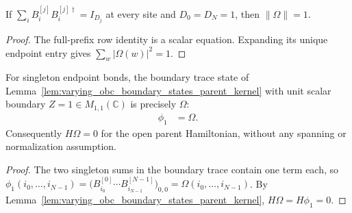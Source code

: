 \begin{lemma}
    \label{lem:varying_obc_scalar_state_normalized}
    \leanok
    If $\sum_iB^{[j]}_i B^{[j]\dagger}_i=I_{D_j}$ at every site and
    $D_0=D_N=1$, then $\|\Omega\|=1$.
\end{lemma}
\begin{proof}\leanok
    The full-prefix row identity is a scalar equation. Expanding its unique
    endpoint entry gives $\sum_w|\Omega(w)|^2=1$.
\end{proof}

\begin{lemma}
    \label{lem:varying_obc_scalar_state_parent_kernel}
    \leanok
    For singleton endpoint bonds, the boundary trace state of
    Lemma~\ref{lem:varying_obc_boundary_states_parent_kernel} with unit
    scalar boundary $Z=1\in M_{1,1}(\mathbb C)$ is precisely $\Omega$:
    \begin{align}
        \phi_1 & =\Omega.
        \label{eq:varying_obc_unit_boundary_state}
    \end{align}
    Consequently $H\Omega=0$ for the open parent Hamiltonian, without any
    spanning or normalization assumption.
\end{lemma}
\begin{proof}\leanok
    The two singleton sums in the boundary trace contain one term each, so
    $\phi_1(i_0,\ldots,i_{N-1})
        =\bigl(B^{[0]}_{i_0}\cdots B^{[N-1]}_{i_{N-1}}\bigr)_{0,0}
        =\Omega(i_0,\ldots,i_{N-1})$.
    By Lemma~\ref{lem:varying_obc_boundary_states_parent_kernel},
    $H\Omega=H\phi_1=0$.
\end{proof}

